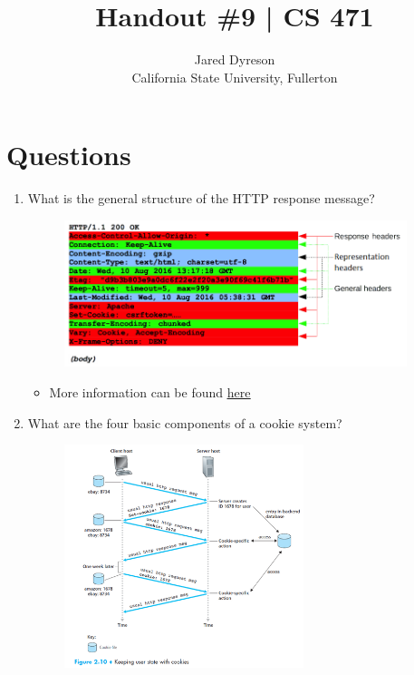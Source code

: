 \documentclass{article}
\title{Handout \#9 | CS 471}
\author{Jared Dyreson\\ 
        California State University, Fullerton}
\begin{document}
\maketitle
\tableofcontents

\newpage

\section{Questions}

\begin{enumerate}
\item What is the general structure of the HTTP response message?

\begin{figure}[!h]
\centering
\includegraphics[width=10cm]{http_response_struct}
\end{figure}

\begin{itemize}
\item More information can be found \href{https://developer.mozilla.org/en-US/docs/Web/HTTP/Messages#http_responses}{\underline{here}}
\end{itemize}

\item What are the four basic components of a cookie system?

\begin{figure}[!h]
\centering
\includegraphics[width=7cm]{cookie_system}
\end{figure}


\end{enumerate}
\end{document}
